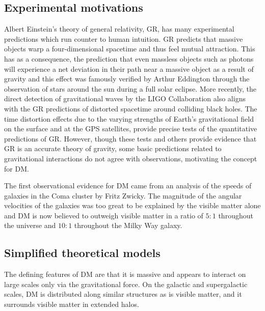  \subsection{Experimental motivations}
  
 Albert Einstein's theory of general relativity, GR,
  has many experimental predictions which 
  run counter to human intuition.
 GR predicts that massive objects
  warp a four-dimensional spacetime and
  thus feel mutual attraction.
 This has as a consequence,
  the prediction that even massless objects
  such as photons will experience a 
  net deviation in their path
  near a massive object as a result of
  gravity and this effect was famously verified
  by Arthur Eddington
  through the observation of stars around the
  sun during a full solar eclipse. 
 More recently, the direct detection of
  gravitational waves by the LIGO
  Collaboration also aligns with the GR
  predictions of distorted spacetime
  around colliding black holes.
 The time distortion effects due to
  the varying strengths of Earth's gravitational
  field on the surface and at the GPS satellites,
  provide precise tests of the quantitative 
  predictions of GR.
 However, though these tests and others provide evidence that
  GR is an accurate theory of gravity,
  some basic predictions related to gravitational interactions 
  do not agree with observations,
  motivating the concept for DM.
  
 The first observational evidence for DM
  came from an analysis of the speeds of galaxies
  in the Coma cluster by Fritz Zwicky.
 The magnitude of the angular velocities of the
  galaxies was too great to be explained by the visible matter
  alone and DM is now believed to outweigh visible
  matter in a ratio of $5:1$ throughout the universe
  and $10:1$ throughout the Milky Way galaxy. 

%

  \subsection{Simplified theoretical models} 

  The defining features of DM are that
   it is massive and appears to interact
   on large scales only via the gravitational force.
  On the galactic and supergalactic scales,
   DM is distributed along similar structures
   as is visible matter, and it surrounds 
   visible matter in extended halos. 

